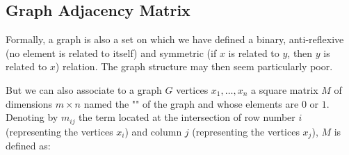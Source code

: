 {	\pagebreak
	\subsection{Graph Adjacency Matrix}\label{adjacency matrix}
	Formally, a graph is also a set on which we have defined a binary, anti-reflexive (no element is related to itself) and symmetric (if $x$ is related to $y$, then $y$ is related to $x$) relation. The graph structure may then seem particularly poor.
	
	But we can also associate to a graph $G$ vertices $x_1,\ldots, x_n$ a square matrix $M$ of dimensions $m\times n$ named the "" of the graph and whose elements are $0$ or $1$. Denoting by $m_{ij}$ the term located at the intersection of row number $i$ (representing the vertices $x_i$) and column $j$ (representing the vertices $x_j$), $M$ is defined as:
	
}
